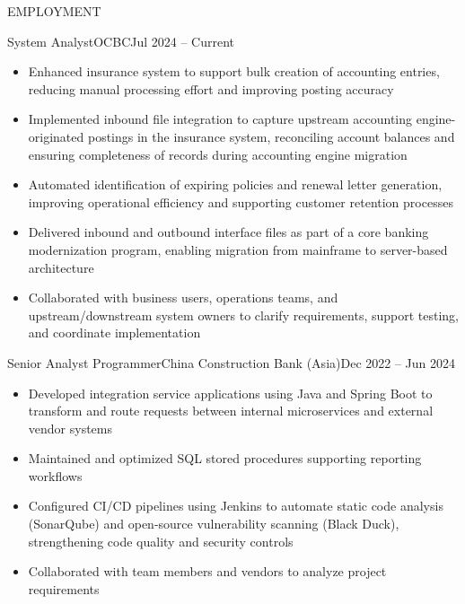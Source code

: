 \documentclass[]{resume}
\begin{document}
	\makeheader
	
	\begin{cvsection}{EMPLOYMENT}
    	\begin{cvsubsection}{System Analyst}{OCBC}{Jul 2024 -- Current}
			\begin{itemize}
                \item Enhanced insurance system to support bulk creation of accounting entries, reducing manual processing effort and improving posting accuracy
                \item Implemented inbound file integration to capture upstream accounting engine-originated postings in the insurance system, reconciling account balances and ensuring completeness of records during accounting engine migration
                \item Automated identification of expiring policies and renewal letter generation, improving operational efficiency and supporting customer retention processes
                \item Delivered inbound and outbound interface files as part of a core banking modernization program, enabling migration from mainframe to server-based architecture
                \item Collaborated with business users, operations teams, and upstream/downstream system owners to clarify requirements, support testing, and coordinate implementation
			\end{itemize}
		\end{cvsubsection}

		\begin{cvsubsection}{Senior Analyst Programmer}{China Construction Bank (Asia)}{Dec 2022 -- Jun 2024}
			\begin{itemize}
                \item Developed integration service applications using Java and Spring Boot to transform and route requests between internal microservices and external vendor systems
                \item Maintained and optimized SQL stored procedures supporting reporting workflows
                \item Configured CI/CD pipelines using Jenkins to automate static code analysis (SonarQube) and open-source vulnerability scanning (Black Duck), strengthening code quality and security controls
                \item Collaborated with team members and vendors to analyze project requirements
			\end{itemize}
		\end{cvsubsection}


\end{cvsection}
\end{document}
